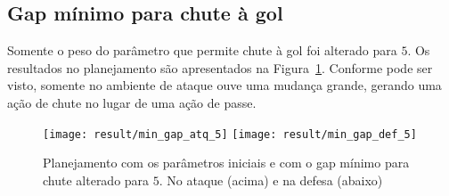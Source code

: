\subsection{Gap mínimo para chute à gol}
Somente o peso do parâmetro que permite chute à gol
foi alterado para $5$. Os resultados no planejamento são
apresentados na Figura~\ref{fig:min_gap_5}. Conforme pode
ser visto, somente no ambiente de ataque ouve uma
mudança grande, gerando uma ação de chute no lugar de
uma ação de passe.
\begin{figure}[H]
  \centering
  \texttt{[image: result/min\_gap\_atq\_5]}
  \texttt{[image: result/min\_gap\_def\_5]}
  \caption{Planejamento com os parâmetros iniciais e com o gap
           mínimo para chute alterado para $5$.
           No ataque (acima) e na defesa (abaixo)}\label{fig:min_gap_5}
\end{figure}
